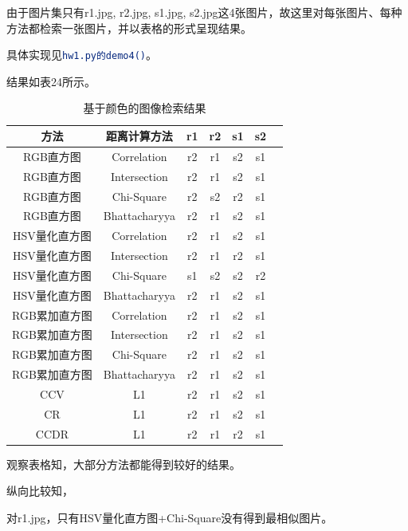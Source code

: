 \documentclass[a4paper, 12pt, UTF8]{article}
\begin{document}
由于图片集只有r1.jpg, r2.jpg, s1.jpg, s2.jpg这4张图片，故这里对每张图片、每种方法都检索一张图片，并以表格的形式呈现结果。

具体实现见\lstinline[language=bash]{hw1.py的demo4()}。

结果如表24所示。

\begin{table}[h!]
    \centering
    \caption{基于颜色的图像检索结果}
    \begin{tabular}{ccccccc}
        方法 & 距离计算方法 & r1 & r2 & s1 & s2 \\ \hline
        RGB直方图     & Correlation   & r2 & r1 & s2 & s1 \\ \hline
        RGB直方图     & Intersection  & r2 & r1 & s2 & s1 \\ \hline
        RGB直方图     & Chi-Square    & r2 & s2 & r2 & s1 \\ \hline
        RGB直方图     & Bhattacharyya & r2 & r1 & s2 & s1 \\ \hline
        HSV量化直方图 & Correlation   & r2 & r1 & s2 & s1 \\ \hline
        HSV量化直方图 & Intersection  & r2 & r1 & r2 & s1 \\ \hline
        HSV量化直方图 & Chi-Square    & s1 & s2 & s2 & r2 \\ \hline
        HSV量化直方图 & Bhattacharyya & r2 & r1 & s2 & s1 \\ \hline
        RGB累加直方图 & Correlation   & r2 & r1 & s2 & s1 \\ \hline
        RGB累加直方图 & Intersection  & r2 & r1 & s2 & s1 \\ \hline
        RGB累加直方图 & Chi-Square    & r2 & r1 & s2 & s1 \\ \hline
        RGB累加直方图 & Bhattacharyya & r2 & r1 & s2 & s1 \\ \hline
        CCV           & L1            & r2 & r1 & s2 & s1 \\ \hline
        CR            & L1            & r2 & r1 & s2 & s1 \\ \hline
        CCDR          & L1            & r2 & r1 & r2 & s1 \\ \hline
    \end{tabular}
\end{table}

观察表格知，大部分方法都能得到较好的结果。

纵向比较知，

对r1.jpg，只有HSV量化直方图+Chi-Square没有得到最相似图片。
\end{document}
